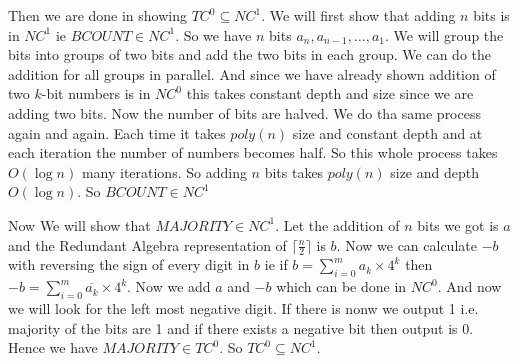 \documentclass[a4paper, 11pt]{article}
\begin{document}
{Then we are done in showing $TC^0\subseteq NC^1$. We will first show that adding $n$ bits is in $NC^1$ ie $BCOUNT\in NC^1$. So we have $n$ bits $a_n,a_{n-1},\dots, a_1$. We will group the bits into groups of two bits and add the two bits in each group. We can do the addition for all groups in parallel. And since we have already shown addition of two $k$-bit numbers is in $NC^0$ this takes constant depth and size since we are adding two bits. Now the number of bits are halved. We do tha same process again and again. Each time it takes $poly(n)$ size and constant depth and at each iteration the number of numbers becomes half. So this whole process takes $O(\log n)$ many iterations. So adding $n$ bits takes $poly(n)$ size and depth $O(\log n)$. So $BCOUNT\in NC^1$



Now We will show that $MAJORITY\in NC^1$. Let the addition of $n$ bits we got is $a$ and the Redundant Algebra representation of $\lceil\frac{n}2\rceil$ is $b$. Now we can calculate $-b$ with reversing the sign of every digit in $b$ ie if $b=\sum\limits_{i=0}^{m}a_k\times 4^k$ then $-b=\sum\limits_{i=0}^m\overline{a_k}\times 4^k$. Now we add $a$ and $-b$ which can be done in $NC^0$. And now we will look for the left most negative digit. If there is nonw we output 1 i.e. majority of the bits are 1 and if there exists a negative bit then output is 0. Hence we have $MAJORITY\in TC^0$. So $TC^0\subseteq NC^1$.
			}
	
	
	
	
\end{document}
